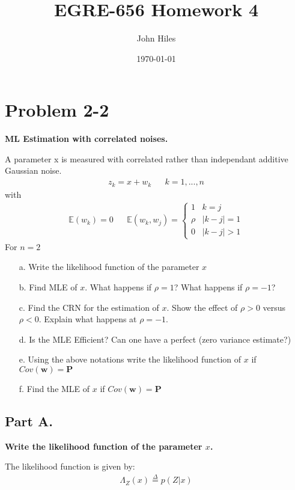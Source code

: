 \documentclass{article}
\title{EGRE-656 Homework 4}
\author{John Hiles}
\date\today
\begin{document}
\maketitle %


\section*{Problem 2-2}
\textbf{ML Estimation with correlated noises.}

	A parameter x is measured with correlated rather than independant additive Gaussian noise.
\begin{align*}
z_k = x + w_k && k=1,...,n
\end{align*}
with
\begin{align*}
\mathbb{E}(w_k) = 0 && \mathbb{E}(w_k,w_j) = \begin{cases} 
      1 &  k = j  \\
      \rho & |k-j| = 1\\
      0 & |k-j| > 1 
   \end{cases}
\end{align*}
For $n=2$
\begin{enumerate}
\item[a.] Write the likelihood function of the parameter $x$
\item[b.] Find MLE of $x$. What happens if $\rho=1$? What happens if $\rho = -1$?
\item[c.] Find the CRN for the estimation of $x$. Show the effect of $\rho>0$ versus $\rho <0$. Explain what happens at $\rho=-1$.
\item[d.] Is the MLE Efficient? Can one have a perfect (zero variance estimate?)
\item[e.] Using the above notations write the likelihood function of $x$ if $Cov(\mathbf{w})=\mathbf{P}$
\item[f.] Find the MLE of $x$ if $Cov(\mathbf{w})=\mathbf{P}$
\end{enumerate}

\subsection*{Part A.}
\textbf{Write the likelihood function of the parameter $x$.}

The likelihood function is given by:
\begin{align*}
\Lambda_Z(x) \overset{\Delta}{=} p(Z|x)
\end{align*}
\end{document}
